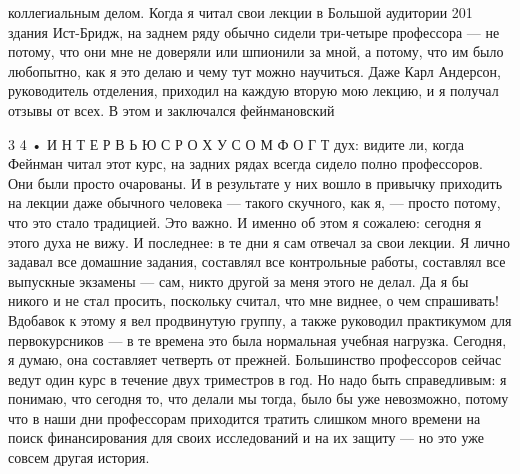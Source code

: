 \documentclass[10pt,oneside]{article}
\begin{document}
коллегиальным делом. Когда я читал свои лекции в Большой аудитории 201 здания Ист-Бридж, на заднем ряду обычно сидели три-четыре профессора --- не потому, что они мне не доверяли или шпионили за мной, а потому, что им было любопытно, как я это делаю и чему тут можно научиться. Даже Карл Андерсон, руководитель отделения, приходил на каждую вторую мою лекцию, и я получал отзывы от всех. В этом и заключался фейнмановский\par

3 4 • И Н Т Е Р В Ь Ю  С  Р О Х У С О М  Ф О Г Т дух: видите ли, когда Фейнман читал этот курс, на задних рядах всегда сидело полно профессоров. Они были просто очарованы. И в результате у них вошло в привычку приходить на лекции даже обычного человека --- такого скучного, как я, --- просто потому, что это стало традицией. Это важно. И именно об этом я сожалею: сегодня я этого духа не вижу. И последнее: в те дни я сам отвечал за свои лекции. Я лично задавал все домашние задания, составлял все контрольные работы, составлял все выпускные экзамены --- сам, никто другой за меня этого не делал. Да я бы никого и не стал просить, поскольку считал, что мне виднее, о чем спрашивать! Вдобавок к этому я вел продвинутую группу, а также руководил практикумом для первокурсников --- в те времена это была нормальная учебная нагрузка. Сегодня, я думаю, она составляет четверть от прежней. Большинство профессоров сейчас ведут один курс в течение двух триместров в год. Но надо быть справедливым: я понимаю, что сегодня то, что делали мы тогда, было бы уже невозможно, потому что в наши дни профессорам приходится тратить слишком много времени на поиск финансирования для своих исследований и на их защиту --- но это уже совсем другая история.\par

\clearpage
{}
\end{document}
